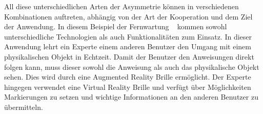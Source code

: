 All diese unterschiedlichen Arten der Asymmetrie können in verschiedenen Kombinationen auftreten, abhängig von der Art der Kooperation und dem Ziel der Anwendung. In diesem Beispiel der Fernwartung ~\parencite{10.1145/2807442.2807497} kommen sowohl unterschiedliche Technologien als auch Funktionalitäten zum Einsatz. In dieser Anwendung lehrt ein Experte einem anderen Benutzer den Umgang mit einem physikalischen Objekt in Echtzeit. Damit der Benutzer den Anweisungen direkt folgen kann, muss dieser sowohl die Anweisung als auch das physikalische Objekt sehen. Dies wird durch eine Augmented Reality Brille ermöglicht. Der Experte hingegen verwendet eine Virtual Reality Brille und verfügt über Möglichkeiten Markierungen zu setzen und wichtige Informationen an den anderen Benutzer zu übermitteln. 
